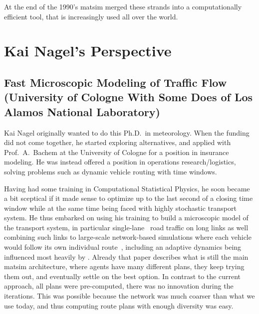 At the end of the 1990’s \gls{matsim} merged these strands into a computationally efficient tool, that is increasingly used all over the world.

\section{Kai Nagel's Perspective}


\subsection{Fast Microscopic Modeling of Traffic Flow (University of Cologne With Some Does of Los Alamos National Laboratory)}
\label{sec:history-u-of-cologne-phase}

Kai Nagel originally wanted to do this Ph.D.\ in meteorology.  When the funding did not come together, he started exploring alternatives, and applied with Prof.\ A.\ Bachem at the University of Cologne for a position in insurance modeling.  He was instead offered a position in operations research/logistics, solving problems such as dynamic vehicle routing with time windows. 

Having had some training in Computational Statistical Physics, he soon became a bit sceptical if it made sense to optimize up to the last second of a closing time window while at the same time being faced with highly stochastic transport system.  He thus embarked on using his training to build a microscopic model of the transport system, in particular single-lane~\citep{NagelSchreckenberg1992CA,Nagel1999flowTheoTrr} road traffic on long links as well combining such links to large-scale network-based simulations where each vehicle would follow its own individual route~\citep{Nagel1996NRW}, including an adaptive dynamics being influenced most heavily by \cite{ArthurBar}.  Already that paper describes what is still the main \gls{matsim} architecture, where agents have many different plans, they keep trying them out, and eventually settle on the best option.  In contrast to the current approach, all plans were pre-computed, \ie there was no innovation during the iterations.  This was possible because the network was much coarser than what we use today, and thus computing route plans with enough diversity was easy.

